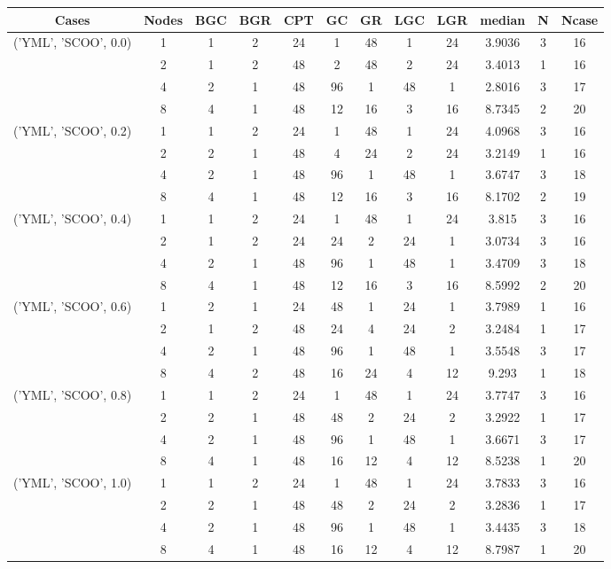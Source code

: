 \begin{tabular}{cccccccccccc}
\hline
Cases & Nodes& BGC& BGR& CPT& GC& GR& LGC& LGR& median & N & Ncase \\
\hline
\multirow{4}{*}{('YML', 'SCOO', 0.0)}& 1& 1& 2& 24& 1& 48& 1& 24& 3.9036& 3& 16\\
& 2& 1& 2& 48& 2& 48& 2& 24& 3.4013& 1& 16\\
& 4& 2& 1& 48& 96& 1& 48& 1& 2.8016& 3& 17\\
& 8& 4& 1& 48& 12& 16& 3& 16& 8.7345& 2& 20\\
\hline
\multirow{4}{*}{('YML', 'SCOO', 0.2)}& 1& 1& 2& 24& 1& 48& 1& 24& 4.0968& 3& 16\\
& 2& 2& 1& 48& 4& 24& 2& 24& 3.2149& 1& 16\\
& 4& 2& 1& 48& 96& 1& 48& 1& 3.6747& 3& 18\\
& 8& 4& 1& 48& 12& 16& 3& 16& 8.1702& 2& 19\\
\hline
\multirow{4}{*}{('YML', 'SCOO', 0.4)}& 1& 1& 2& 24& 1& 48& 1& 24& 3.815& 3& 16\\
& 2& 1& 2& 24& 24& 2& 24& 1& 3.0734& 3& 16\\
& 4& 2& 1& 48& 96& 1& 48& 1& 3.4709& 3& 18\\
& 8& 4& 1& 48& 12& 16& 3& 16& 8.5992& 2& 20\\
\hline
\multirow{4}{*}{('YML', 'SCOO', 0.6)}& 1& 2& 1& 24& 48& 1& 24& 1& 3.7989& 1& 16\\
& 2& 1& 2& 48& 24& 4& 24& 2& 3.2484& 1& 17\\
& 4& 2& 1& 48& 96& 1& 48& 1& 3.5548& 3& 17\\
& 8& 4& 2& 48& 16& 24& 4& 12& 9.293& 1& 18\\
\hline
\multirow{4}{*}{('YML', 'SCOO', 0.8)}& 1& 1& 2& 24& 1& 48& 1& 24& 3.7747& 3& 16\\
& 2& 2& 1& 48& 48& 2& 24& 2& 3.2922& 1& 17\\
& 4& 2& 1& 48& 96& 1& 48& 1& 3.6671& 3& 17\\
& 8& 4& 1& 48& 16& 12& 4& 12& 8.5238& 1& 20\\
\hline
\multirow{4}{*}{('YML', 'SCOO', 1.0)}& 1& 1& 2& 24& 1& 48& 1& 24& 3.7833& 3& 16\\
& 2& 2& 1& 48& 48& 2& 24& 2& 3.2836& 1& 17\\
& 4& 2& 1& 48& 96& 1& 48& 1& 3.4435& 3& 18\\
& 8& 4& 1& 48& 16& 12& 4& 12& 8.7987& 1& 20\\
\hline
\end{tabular}
